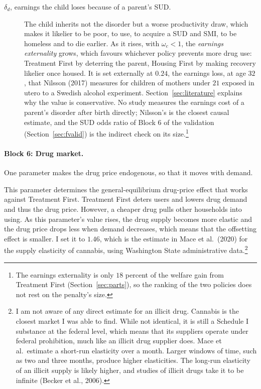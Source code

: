 \documentclass[10pt]{article}
\begin{document}
\begin{description}
\item[$\delta_d$, earnings the child loses because of a parent's SUD.] The child inherits not the disorder but a worse productivity draw, which makes it likelier to be poor, to use, to acquire a SUD and SMI, to be homeless and to die earlier. As it rises, with $\omega_c<1$, the \emph{earnings externality} grows, which favours whichever policy prevents more drug use: Treatment First by deterring the parent, Housing First by making recovery likelier once housed. It is set externally at $0.24$, the earnings loss, at age $32$, that Nilsson (2017) measures for children of mothers under $21$ exposed in utero to a Swedish alcohol experiment. Section~\ref{sec:literature} explains why the value is conservative. No study measures the earnings cost of a parent's disorder after birth directly; Nilsson's is the closest causal estimate, and the SUD odds ratio of Block 6 of the validation (Section~\ref{sec:fvalid}) is the indirect check on its size.\footnote{The earnings externality is only $18$ percent of the welfare gain from Treatment First (Section~\ref{sec:parts}), so the ranking of the two policies does not rest on the penalty's size.}
\end{description}

\paragraph{Block 6: Drug market.} One parameter makes the drug price endogenous, so that it moves with demand.
\begin{description}\setlength{\itemsep}{0.25em}\setlength{\parskip}{0em}
\item[$\varepsilon_s$, the price elasticity of drug supply.]   This parameter determines the general-equilibrium drug-price effect that works against Treatment First. Treatment First deters users and lowers drug demand and thus the drug price. However, a cheaper drug pulls other households into using. As this parameter's value rises, the drug supply becomes more elastic and the drug price drops less when demand decreases, which means that the offsetting effect is smaller. I set it to $1.46$, which is the estimate in Mace et al.\ (2020) for the supply elasticity of cannabis, using Washington State administrative data.\footnote{  I am not aware of any direct estimate for an illicit drug. Cannabis is the closest market I was able to find. While not identical, it is still a Schedule I substance at the federal level, which means that its suppliers operate under federal prohibition, much like an illicit drug supplier does. Mace et al.\ estimate a short-run elasticity over a month. Larger windows of time, such as two and three months, produce higher elasticities. The long-run elasticity of an illicit supply is likely higher, and studies of illicit drugs take it to be infinite (Becker et al., 2006).}
\end{description}
\end{document}
